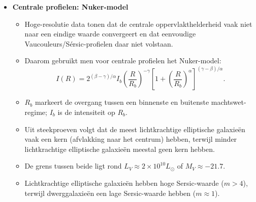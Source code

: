 \documentclass[10pt,a4paper]{article}
\renewenvironment{equation}{\begin{equation*}}{\end{equation*}}
\begin{document}
\begin{itemize}
  \item \textbf{Centrale profielen: Nuker-model}
  \begin{itemize}
    \item Hoge-resolutie data tonen dat de centrale oppervlakthelderheid vaak niet naar een eindige waarde convergeert en dat eenvoudige Vaucouleurs/S\'ersic-profielen daar niet volstaan.
    \item Daarom gebruikt men voor centrale profielen het Nuker-model:
    \begin{equation}
      I(R)=2^{(\beta-\gamma)/\alpha}I_b
      \left(\frac{R}{R_b}\right)^{-\gamma}
      \left[1+\left(\frac{R}{R_b}\right)^{\alpha}\right]^{(\gamma-\beta)/\alpha}.
      \tag{2.47}
    \end{equation}
    \item $R_b$ markeert de overgang tussen een binnenste en buitenste machtswet-regime; $I_b$ is de intensiteit op $R_b$.
    \item Uit steekproeven volgt dat de meest lichtkrachtige elliptische galaxieën vaak een kern (afvlakking naar het centrum) hebben, terwijl minder lichtkrachtige elliptische galaxieën meestal geen kern hebben.
    \item De grens tussen beide ligt rond $L_V \approx 2\times 10^{10}L_\odot$ of $M_V\approx -21.7$.
    \item Lichtkrachtige elliptische galaxieën hebben hoge Sersic-waarde ($m>4$), terwijl dwerggalaxieën een lage Sersic-waarde hebben ($m\approx1$).
  \end{itemize}


\end{itemize}
\end{document}
